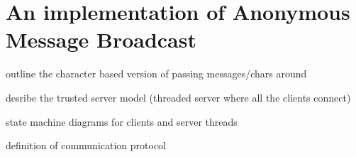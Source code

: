 \section{An implementation of Anonymous Message Broadcast}

outline the character based version of passing messages/chars around

desribe the trusted server model (threaded server where all the clients
connect)

state machine diagrams for clients and server threads

definition of communication protocol
